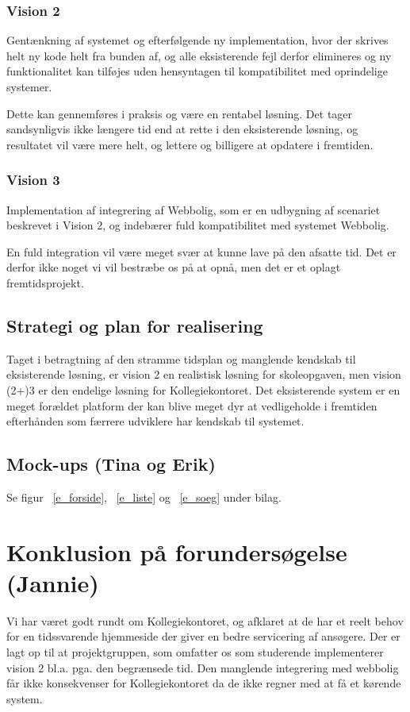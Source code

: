\documentclass[12pt, a4paper]{report}
\begin{document}
\subsubsection{Vision 2}
Gentænkning af systemet og efterfølgende ny implementation, hvor der skrives helt ny kode helt fra bunden af, og alle eksisterende fejl derfor elimineres og ny funktionalitet kan tilføjes uden hensyntagen til kompatibilitet med oprindelige systemer.

Dette kan gennemføres i praksis og være en rentabel løsning. Det tager sandsynligvis ikke længere tid end at rette i den eksisterende løsning, og resultatet vil være mere helt, og lettere og billigere at opdatere i fremtiden.

\subsubsection{Vision 3}
Implementation af integrering af Webbolig, som er en udbygning af scenariet beskrevet i Vision 2, og indebærer fuld kompatibilitet med systemet Webbolig.

En fuld integration vil være meget svær at kunne lave på den afsatte tid. Det er derfor ikke noget vi vil bestræbe os på at opnå, men det er et oplagt fremtidsprojekt.

\subsection{Strategi og plan for realisering}
Taget i betragtning af den stramme tidsplan og manglende kendskab til eksisterende løsning, er vision 2 en realistisk løsning for skoleopgaven, men vision (2+)3 er den endelige løsning for Kollegiekontoret. Det eksisterende system er en meget forældet platform der kan blive meget dyr at vedligeholde i fremtiden efterhånden som færrere udviklere har kendskab til systemet.

\subsection{Mock-ups (Tina og Erik)}
Se figur ~\ref{e_forside}, ~\ref{e_liste} og ~\ref{e_soeg} under bilag.

\section{Konklusion på forundersøgelse (Jannie)}
Vi har været godt rundt om Kollegiekontoret, og afklaret at de har et reelt behov for en tidssvarende hjemmeside der giver en bedre servicering af ansøgere. Der er lagt op til at projektgruppen, som omfatter os som studerende implementerer vision 2 bl.a. pga. den begrænsede tid. Den manglende integrering med webbolig får ikke konsekvenser for Kollegiekontoret da de ikke regner med at få et kørende system.
\end{document}
